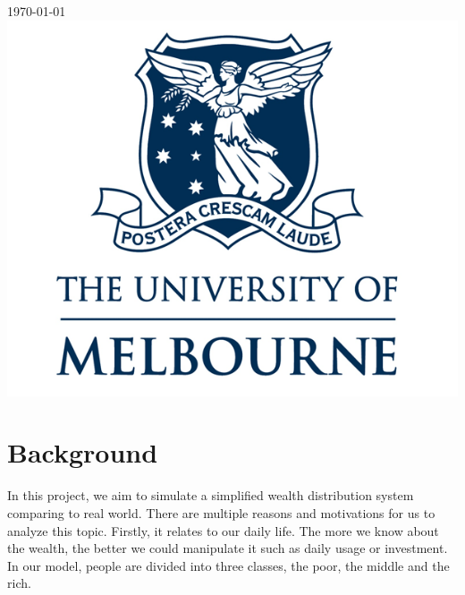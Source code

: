 \begin{titlepage}
{\large \today}\\[2cm] %


\includegraphics[scale = 0.27]{logo.png}\\[1cm] %
 

\vfill %

\end{titlepage}


\section{Background}
 In this project, we aim to simulate a simplified wealth distribution system comparing to real world.
There are multiple reasons and motivations for us to analyze this topic. Firstly, it relates to our daily life. The more we know about the wealth, the better we could manipulate it such as daily usage or investment. In our model, people are divided into three classes, the poor, the middle and the rich.\\


